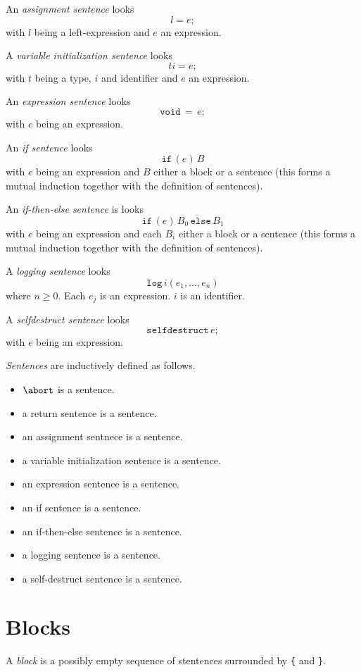 \documentclass{book}
\begin{document}
An \textit{assignment sentence} looks
\[
l = e;
\]
with $l$ being a left-expression and $e$ an expression.

A \textit{variable initialization sentence} looks
\[
t i = e;
\]
with $t$ being a type, $i$ and identifier and $e$ an expression.

An \textit{expression sentence} looks
\[
\texttt{void}\, = \,e;
\]
with $e$ being an expression.

An \textit{if sentence} looks
\[
\texttt{if}\, (e)\, B
\]
with $e$ being an expression and $B$ either a block or a sentence (this forms a mutual induction together with the definition of sentences).

An \textit{if-then-else sentence} is looks
\[
\texttt{if}\, (e)\, B_0 \,\texttt{else}\, B_1
\]
with $e$ being an expression and each $B_i$ either a block or a sentence (this forms a mutual induction together with the definition of sentences).

A \textit{logging sentence} looks
\[
\texttt{log}\,i(e_1, \ldots, e_n)
\]
where $n \ge 0$.  Each $e_j$ is an expression.  $i$ is an identifier.

A \textit{selfdestruct sentence} looks
\[
\texttt{selfdestruct}\, e;
\]
with $e$ being an expression.

\textit{Sentences} are inductively defined as follows.

\begin{itemize}
\item $\abort$ is a sentence.
\item a return sentence is a sentence.
\item an assignment sentnece is a sentence.
\item a variable initialization sentence is a sentence.
\item an expression sentence is a sentence.
\item an if sentence is a sentence.
\item an if-then-else sentence is a sentence.
\item a logging sentence is a sentence.
\item a self-destruct sentence is a sentence.
\end{itemize}

\section{Blocks}

A \textit{block} is a possibly empty sequence of stentences surrounded by \texttt{\{} and \texttt{\}}.
\end{document}
